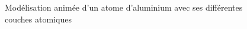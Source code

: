 

\begin{figure}[!h]
		\centering
		\caption{Modélisation animée d'un atome d'aluminium avec ses différentes couches atomiques}
		\label{fig:aluminium_modelisation_animee}
\end{figure}

%